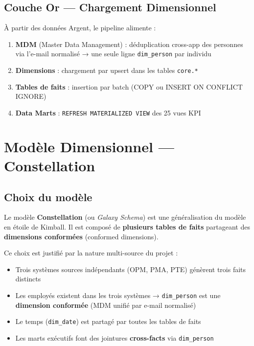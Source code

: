 \documentclass[a4paper,12pt]{article}
\begin{document}
\subsection{Couche Or — Chargement Dimensionnel}

À partir des données Argent, le pipeline alimente :
\begin{enumerate}[leftmargin=1.5cm]
  \item \textbf{MDM} (Master Data Management) : déduplication cross-app des personnes
        via l'e-mail normalisé → une seule ligne \texttt{dim\_person} par individu
  \item \textbf{Dimensions} : chargement par upsert dans les tables \texttt{core.*}
  \item \textbf{Tables de faits} : insertion par batch (COPY ou INSERT ON CONFLICT IGNORE)
  \item \textbf{Data Marts} : \texttt{REFRESH MATERIALIZED VIEW} des 25 vues KPI
\end{enumerate}

\section{Modèle Dimensionnel — Constellation}

\subsection{Choix du modèle}

Le modèle \textbf{Constellation} (ou \textit{Galaxy Schema}) est une généralisation du
modèle en étoile de Kimball. Il est composé de \textbf{plusieurs tables de faits}
partageant des \textbf{dimensions conformées} (conformed dimensions).

Ce choix est justifié par la nature multi-source du projet :
\begin{itemize}[leftmargin=1.5cm]
  \item Trois systèmes sources indépendants (OPM, PMA, PTE) génèrent trois faits distincts
  \item Les employés existent dans les trois systèmes → \texttt{dim\_person} est une
        \textbf{dimension conformée} (MDM unifié par e-mail normalisé)
  \item Le temps (\texttt{dim\_date}) est partagé par toutes les tables de faits
  \item Les marts exécutifs font des jointures \textbf{cross-facts} via \texttt{dim\_person}
\end{itemize}
\end{document}
